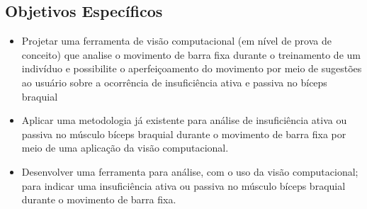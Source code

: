 \subsection{Objetivos Específicos}	

\begin{itemize}

    \item Projetar uma ferramenta de visão computacional (em nível de prova de conceito) que analise o movimento de barra fixa durante o treinamento de um indivíduo e possibilite o aperfeiçoamento do movimento por meio de sugestões ao usuário sobre a ocorrência de insuficiência ativa e passiva no bíceps braquial

    \item Aplicar uma metodologia já existente para análise de insuficiência ativa ou passiva no músculo bíceps braquial durante o movimento de barra fixa por meio de uma aplicação da visão computacional.

    \item Desenvolver uma ferramenta para análise, com o uso da visão computacional; para indicar uma insuficiência ativa ou passiva no músculo bíceps braquial durante o movimento de barra fixa.

\end{itemize}